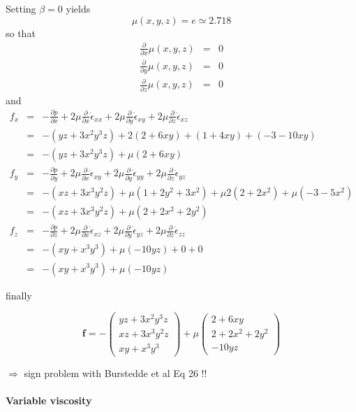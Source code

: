 Setting $\beta=0$ yields 
\[
\mu(x,y,z) = e \simeq 2.718
\]
so that 
\begin{eqnarray}
\frac{\partial }{\partial x} \mu(x,y,z) &=& 0 \\
\frac{\partial }{\partial y} \mu(x,y,z) &=& 0 \\
\frac{\partial }{\partial z} \mu(x,y,z) &=& 0
\end{eqnarray}
and 
\begin{eqnarray}
f_x 
&=& 
-\frac{\partial p}{\partial x} 
+2\mu\frac{\partial}{\partial x} \dot{\epsilon}_{xx}
+2\mu\frac{\partial}{\partial y} \dot{\epsilon}_{xy}
+2\mu\frac{\partial}{\partial z} \dot{\epsilon}_{xz} \nonumber\\
&=&
-(yz+3x^2y^3z)
+ 2(2 +6xy) + (1+4xy) + (-3 -10xy)   \\
&=&
-(yz+3x^2y^3z)
+\mu(2+6xy ) \\
f_y 
&=&  
-\frac{\partial p}{\partial y} 
+2\mu\frac{\partial}{\partial x} \dot{\epsilon}_{xy}
+2\mu\frac{\partial}{\partial y} \dot{\epsilon}_{yy}
+2\mu\frac{\partial}{\partial z} \dot{\epsilon}_{yz}  \nonumber\\
&=&
-(xz +3x^3y^2z)
+
\mu(1+2y^2+3x^2)
+\mu2( 2+2x^2 )  
+\mu(-3-5x^2) \\
&=&
-(xz +3x^3y^2z)
+ \mu ( 2 + 2x^2 +  2y^2)
\\ 
f_z 
&=&
-\frac{\partial p}{\partial z} 
+2\mu\frac{\partial}{\partial x} \dot{\epsilon}_{xz}
+2\mu\frac{\partial}{\partial y} \dot{\epsilon}_{yz}
+2\mu\frac{\partial}{\partial z} \dot{\epsilon}_{zz}  \nonumber\\
&=&
-(xy+x^3y^3) 
+ \mu (-10yz) + 0 + 0 \\
&=&
-(xy+x^3y^3) 
+\mu (-10yz) 
\end{eqnarray}

finally

\[
{\bm f} = 
-
\left(
\begin{array}{c}
yz+3x^2y^3z\\
xz +3x^3y^2z \\
xy+x^3y^3
\end{array}
\right)
+\mu
\left(
\begin{array}{c}
2+6xy  \\
2 + 2x^2 +  2y^2 \\
-10yz 
\end{array}
\right)
\]

$\Rightarrow$ sign problem with Burstedde et al Eq 26 !!



\paragraph{Variable viscosity}

